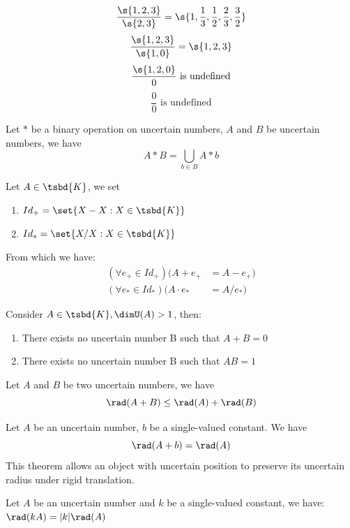 \begin{example}
	$$\frac{\s{1,2,3}}{\s{2,3}} = \s{1,\frac{1}{3},\frac{1}{2},\frac{2}{3},\frac{3}{2}}$$
	$$\frac{\s{1,2,3}}{\s{1,0}} = \s{1,2,3}$$
	$$\frac{\s{1,2,0}}{0} \text{ is undefined}$$
	$$\frac{0}{0} \text{ is undefined}$$
\end{example}
\begin{md}
	Let $*$ be a binary operation on uncertain numbers, $A$ and $B$ be uncertain numbers, we have
	\[A*B = \bigcup_{b \in B} {A * b} \]
\end{md}
\begin{theorem}
	Let $A \in \tsbd{K}$, we set \begin{enumerate}
		\item $Id_+=\set{X-X: X \in \tsbd{K}}$
		\item $Id_*=\set{X/X: X \in \tsbd{K}}$
	\end{enumerate}
	From which we have: 
	\begin{align*}
		(\forall e_+ \in Id_+)(A + e_+ &= A - e_+) \\
		(\forall e_* \in Id_*)(A \cdot e_* &= A / e_*)
	\end{align*}
\end{theorem}
\begin{theorem}[Inverse]
	Consider $A \in \tsbd{K}, \dimU(A) > 1$, then:
	\begin{enumerate}
		\item There exists no uncertain number B such that $A+B = 0$
		\item There exists no uncertain number B such that $AB = 1$
	\end{enumerate}
\end{theorem}
\begin{theorem}
	Let $A$ and $B$ be two uncertain numbers, we have $$\rad(A+B) \leq \rad(A) +\rad(B)$$
\end{theorem}
\begin{theorem}
	Let $A$ be an uncertain number, $b$ be a single-valued constant. We have $$\rad(A+b) = \rad(A)$$
	This theorem allows an object with uncertain position to preserve its uncertain radius under rigid translation.
\end{theorem}
\begin{theorem}
	Let $A$ be an uncertain number and $k$ be a single-valued constant, we have: $\rad(k A) = |k| \rad(A)$
\end{theorem}

